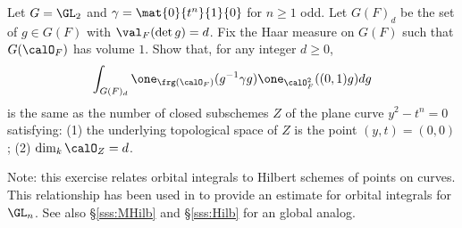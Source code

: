 \subsubsection{} Let $G=\GL_{2}$ and $\gamma=\mat{0}{t^{n}}{1}{0}$ for $n\geq 1$ odd. Let $G(F)_{d}$ be the set of $g\in G(F)$ with $\val_{F}(\det g)=d$. Fix the Haar measure on $G(F)$ such that $G(\calO_{F})$ has volume $1$. Show that, for any integer $d\geq0$,
\begin{equation*}
\int_{G(F)_{d}}\one_{\frg(\calO_{F})}(g^{-1}\gamma g)\one_{\calO^{2}_{F}}((0,1)g)dg
\end{equation*}
is the same as the number of closed subschemes $Z$ of the plane curve $y^{2}-t^{n}=0$ satisfying: (1) the underlying topological space of $Z$ is the point $(y,t)=(0,0)$; (2) $\dim_{k}\calO_{Z}=d$.

Note: this exercise relates orbital integrals to Hilbert schemes of points on curves. This relationship has been used in \cite{Y-Orb} to provide an estimate for orbital integrals for $\GL_{n}$. See also \S\ref{sss:MHilb} and \S\ref{sss:Hilb} for an global analog.



